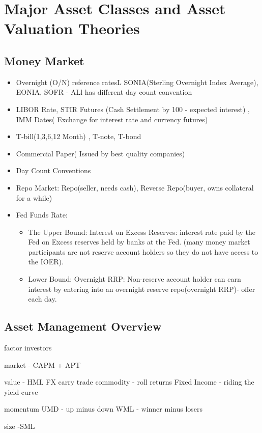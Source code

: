 \documentclass[11pt, openany]{book}              %
\begin{document}
\chapter{Major Asset Classes and Asset Valuation Theories}
\section{Money Market}

\begin{itemize}
    \item Overnight (O/N) reference ratesL SONIA(Sterling Overnight Index Average), EONIA, SOFR - ALl has different day count convention
    \item LIBOR Rate, STIR Futures (Cash Settlement by 100 - expected interest) , IMM Dates( Exchange for interest rate and currency futures)
    \item T-bill(1,3,6,12 Month) , T-note, T-bond
    \item Commercial Paper( Issued by best quality companies)
    \item Day Count Conventions
    \item Repo Market: Repo(seller, needs cash), Reverse Repo(buyer, owns collateral for a while)
    \item Fed Funds Rate: 
    \begin{itemize}
    	\item The Upper Bound: Interest on Excess Reserves: interest rate paid by the Fed on Excess reserves held by banks at the Fed. (many money market participants are not reserve account holders so they do not have access to the IOER). 
    	\item Lower Bound: Overnight RRP: Non-reserve account holder can earn interest by entering into an overnight reserve repo(overnight RRP)- offer each day.
    \end{itemize}
\end{itemize}

\section{Asset Management Overview}
factor investors

market - CAPM + APT

value - HML
  FX carry trade
  commodity - roll returns
  Fixed Income - riding the yield curve 
  
momentum 
   UMD - up minus down
   WML - winner minus losers

size -SML 
\end{document}
